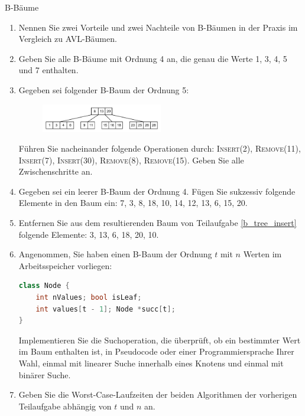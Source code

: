 \documentclass[11pt,a4paper]{article}
\begin{document}
\begin{aufgabe}{3}{B-Bäume}
    \begin{enumerate}[label=\alph*)]
        \item
        Nennen Sie zwei Vorteile und zwei Nachteile von B-Bäumen in der Praxis im Vergleich zu AVL-Bäumen.

        \item Geben Sie alle B-Bäume mit Ordnung 4 an, die genau die Werte 1, 3, 4, 5 und 7 enthalten.
        
        \item
        Gegeben sei folgender B-Baum der Ordnung 5:
        \begin{figure}[h!]
            \centering
            \includegraphics[width=0.5\textwidth]{img/3d}
        \end{figure}
        \FloatBarrier
        Führen Sie nacheinander folgende Operationen durch: 
        \textsc{Insert(2)}, \textsc{Remove(11)}, \textsc{Insert(7)}, \textsc{Insert(30)}, \textsc{Remove(8)}, \textsc{Remove(15)}.
        Geben Sie alle Zwischenschritte an.

        \item\label{b_tree_insert} Gegeben sei ein leerer B-Baum der Ordnung 4. Fügen Sie sukzessiv folgende Elemente in den Baum ein: 
        7, 3, 8, 18, 10, 14, 12, 13, 6, 15, 20.

        \item
        Entfernen Sie aus dem resultierenden Baum von Teilaufgabe \ref*{b_tree_insert} folgende Elemente:
        3, 13, 6, 18, 20, 10.

        \item \hard Angenommen, Sie haben einen B-Baum der Ordnung $t$ mit $n$ Werten im Arbeitsspeicher vorliegen:
        \begin{lstlisting}[language=c++]
class Node {
    int nValues; bool isLeaf;
    int values[t - 1]; Node *succ[t];
}
        \end{lstlisting}
        Implementieren Sie die Suchoperation, die überprüft, ob ein bestimmter Wert im Baum enthalten ist, in Pseudocode oder einer Programmiersprache Ihrer Wahl, einmal mit linearer Suche innerhalb eines Knotens und einmal mit binärer Suche.

        \item \hard Geben Sie die Worst-Case-Laufzeiten der beiden Algorithmen der vorherigen Teilaufgabe abhängig von $t$ und $n$ an.
    \end{enumerate}
\end{aufgabe}
\end{document}

